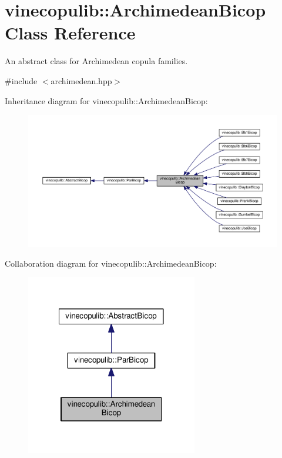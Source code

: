 \hypertarget{classvinecopulib_1_1_archimedean_bicop}{\section{vinecopulib\+:\+:Archimedean\+Bicop Class Reference}
\label{classvinecopulib_1_1_archimedean_bicop}
}


An abstract class for Archimedean copula families.  




{\ttfamily \#include $<$archimedean.\+hpp$>$}



Inheritance diagram for vinecopulib\+:\+:Archimedean\+Bicop\+:\nopagebreak
\begin{figure}[H]
\begin{center}
\leavevmode
\includegraphics[width=350pt]{classvinecopulib_1_1_archimedean_bicop__inherit__graph}
\end{center}
\end{figure}


Collaboration diagram for vinecopulib\+:\+:Archimedean\+Bicop\+:\nopagebreak
\begin{figure}[H]
\begin{center}
\leavevmode
\includegraphics[width=212pt]{classvinecopulib_1_1_archimedean_bicop__coll__graph}
\end{center}
\end{figure}
